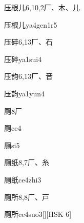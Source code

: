\begin{Entry}{压根儿}{6,10,2}{⼚、⽊、⼉}
  \begin{Phonetics}{压根儿}{ya4gen1r5}
  \end{Phonetics}
\end{Entry}

\begin{Entry}{压碎}{6,13}{⼚、⽯}
  \begin{Phonetics}{压碎}{ya1sui4}
  \end{Phonetics}
\end{Entry}

\begin{Entry}{压韵}{6,13}{⼚、⾳}
  \begin{Phonetics}{压韵}{ya1yun4}
  \end{Phonetics}
\end{Entry}

\begin{Entry}{厕}{8}{⼚}
  \begin{Phonetics}{厕}{ce4}
  \end{Phonetics}
  \begin{Phonetics}{厕}{si5}
  \end{Phonetics}
\end{Entry}

\begin{Entry}{厕纸}{8,7}{⼚、⽷}
  \begin{Phonetics}{厕纸}{ce4zhi3}
  \end{Phonetics}
\end{Entry}

\begin{Entry}{厕所}{8,8}{⼚、⼾}
  \begin{Phonetics}{厕所}{ce4suo3}[][HSK 6]
  \end{Phonetics}
\end{Entry}

